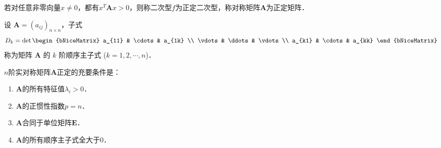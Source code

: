 \documentclass[12pt, a4paper, oneside, UTF8]{ctexbook}
\begin{document}
\begin{definition}[正定性]
    若对任意非零向量$x \neq 0$，都有$x^T \bm{A} x > 0$，则称二次型$f$为正定二次型，称对称矩阵$\bm{A}$为正定矩阵．
\end{definition}
\begin{definition}[顺序主子式]
    设 $\bm{A} = (a_{ij})_{n \times n}$，子式
    \[ D_k = \det
    \begin{bNiceMatrix}
        a_{11} & \cdots & a_{1k} \\
        \vdots & \ddots & \vdots \\
        a_{k1} & \cdots & a_{kk}
    \end{bNiceMatrix} \]
    称为矩阵 $\bm{A}$ 的 $k$ 阶顺序主子式 ($k = 1, 2, \cdots, n$)．
\end{definition}
\begin{theorem}[正定矩阵的判别]
    $n$阶实对称矩阵$\bm{A}$正定的充要条件是：
    \begin{enumerate}
        \item $\bm{A}$的所有特征值$\lambda_i > 0$．
        \item $\bm{A}$的正惯性指数$p = n$．
        \item $\bm{A}$合同于单位矩阵$\bm{E}$．
        \item $\bm{A}$的所有顺序主子式全大于0．
    \end{enumerate}
\end{theorem}
\end{document}
